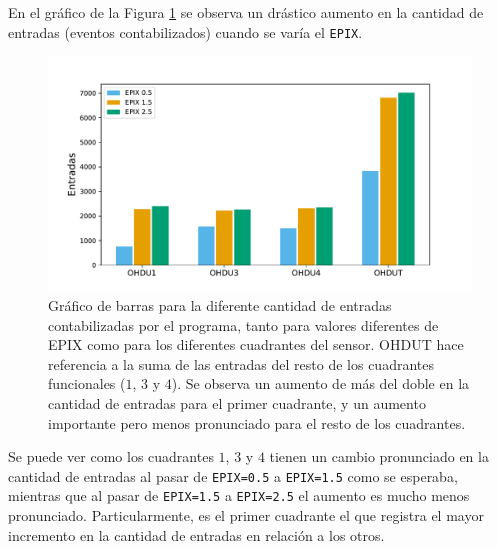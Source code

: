 En el gráfico de la Figura \ref{fig:EntradasVsEpix} se observa un drástico aumento en la cantidad de entradas (eventos contabilizados) cuando se varía el \verb|EPIX|. %
\begin{figure}[h]
    \centering
    \includegraphics[scale=0.5]{Figs/Entradas_vs_Epix.pdf}
    \caption{Gráfico de barras para la diferente cantidad de entradas contabilizadas por el programa, tanto para valores diferentes de EPIX como para los diferentes cuadrantes del sensor. OHDUT hace referencia a la suma de las entradas del resto de los cuadrantes funcionales ($1$, $3$ y $4$). Se observa un aumento de más del doble en la cantidad de entradas para el primer cuadrante, y un aumento importante pero menos pronunciado para el resto de los cuadrantes.}
    \label{fig:EntradasVsEpix}
\end{figure}
Se puede ver como los cuadrantes $1$, $3$ y $4$ tienen un cambio pronunciado en la cantidad de entradas al pasar de \verb|EPIX=0.5| a \verb|EPIX=1.5| como se esperaba, mientras que al pasar de \verb|EPIX=1.5| a \verb|EPIX=2.5| el aumento es mucho menos pronunciado. 
Particularmente, es el primer cuadrante el que registra el mayor incremento en la cantidad de entradas en relación a los otros. 

